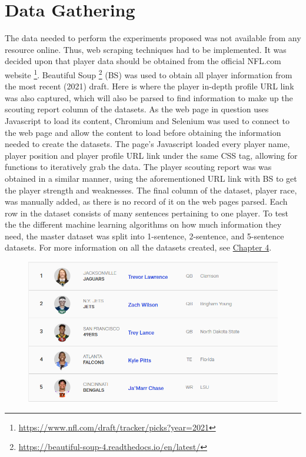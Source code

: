\documentclass[oneside,12pt]{Classes/RoboticsLaTeX}
\begin{document}
\section{Data Gathering}
The data needed to perform the experiments proposed was not available from any resource online. Thus, web scraping techniques had to be implemented. It was decided upon that player data should
be obtained from the official NFL.com website \footnote{\url{https://www.nfl.com/draft/tracker/picks?year=2021}}. Beautiful Soup \footnote{\url{https://beautiful-soup-4.readthedocs.io/en/latest/}} (BS)
was used to obtain all player information from the most recent (2021) draft. Here is where the player in-depth profile URL link was also captured, which will also be parsed to find information to
make up the scouting report column of the datasets. As the web page in question uses Javascript to load its content, Chromium and Selenium was used to connect to the web page and allow the content to load before obtaining the information
needed to create the datasets. The page's Javascript loaded every player name, player position and player profile URL link under the same CSS tag, allowing for functions to iteratively grab the data.
The player scouting report was was obtained in a similar manner, using the aforementioned URL link with BS to get the player strength and weaknesses. The final column of the dataset, player race, 
was manually added, as there is no record of it on the web pages parsed. Each row in the dataset consists of many sentences pertaining to one player. To test the the different machine learning algorithms 
on how much information they need, the master dataset was split into 1-sentence, 2-sentence, and 5-sentence datasets. For more information on all the datasets created, see \hyperref[sec:class_data]{Chapter 4}.

\begin{figure}[hb]
  \centering
  \begin{minipage}{1\textwidth}
    \centering
    \includegraphics[width=1\linewidth]{Figures/NFLcom_example.png}
    \label{fig:NFL_draft}
  \end{minipage}%
\end{figure}
\end{document}
